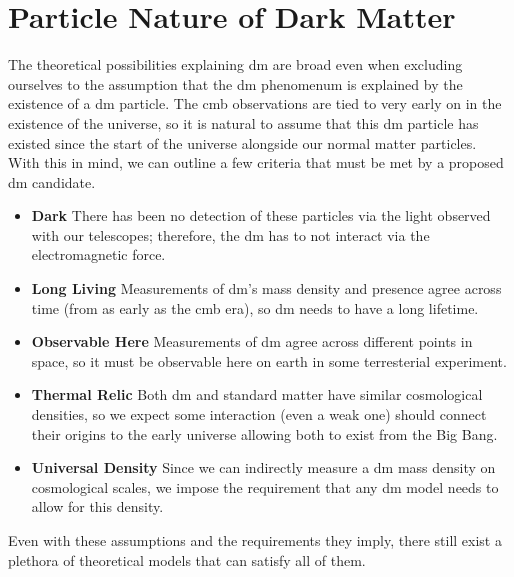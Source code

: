 \section{Particle Nature of Dark Matter}
The theoretical possibilities explaining \ac{dm} are broad \cite{darksectors-2016} even when
excluding ourselves to the assumption that the \ac{dm} phenomenum is explained by the existence
of a \ac{dm} particle. The \ac{cmb} observations are tied to very early on in the existence
of the universe, so it is natural to assume that this \ac{dm} particle has existed since the
start of the universe alongside our normal matter particles. With this in mind, we can outline
a few criteria that must be met by a proposed \ac{dm} candidate.
\begin{itemize}
	\item \textbf{Dark} There has been no detection of these particles via the light observed with our telescopes;
	      therefore, the \ac{dm} has to not interact via the electromagnetic force.
	\item \textbf{Long Living} Measurements of \ac{dm}'s mass density and presence agree across time
	      (from as early as the \ac{cmb} era), so \ac{dm} needs to have a long lifetime.
	\item \textbf{Observable Here} Measurements of \ac{dm} agree across different points in space,
	      so it must be observable here on earth in some terresterial experiment.
	\item \textbf{Thermal Relic} Both \ac{dm} and standard matter have similar
	      cosmological densities, so we expect some interaction (even a weak one) should connect their
	      origins to the early universe allowing both to exist from the Big Bang.
	\item \textbf{Universal Density} Since we can indirectly measure a \ac{dm} mass density on
	      cosmological scales, we impose the requirement that any \ac{dm} model needs to allow for
	      this density.
\end{itemize}
Even with these assumptions and the requirements they imply, there still exist a plethora of
theoretical models that can satisfy all of them.

